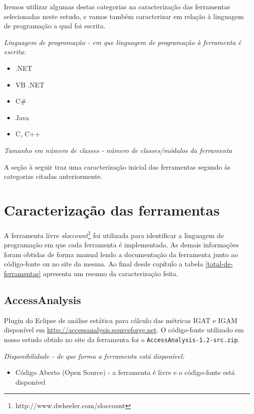 Iremos utilizar algumas destas categorias na caracterização das ferramentas
selecionadas neste estudo, e vamos também caracterizar em relação à linguagem de
programação a qual foi escrita.

\begin{description}

  \item {\it Linguagem de programação - em que linguagem de programação à ferramenta é escrita:}
    \begin{itemize}
      \item .NET
      \item VB .NET
      \item C\#
      \item Java
      \item C, C++
    \end{itemize}

  \item {\it Tamanho em número de classes - número de classes/módulos da ferramenta}

\end{description}

A seção à seguir traz uma caracterização inicial das ferramentas segundo às
categorias citadas anteriormente.

\section{Caracterização das ferramentas} \label{caracterizacao-das-ferramentas}

A ferramenta livre {\it sloccount}\footnote{http://www.dwheeler.com/sloccount}
foi utilizada para identificar a linguagem de programação em que cada
ferramenta é implementada. As demais informações foram obtidas de forma manual
lendo a documentação da ferramenta junto ao código-fonte ou no site da mesma.
Ao final desde capítulo a tabela \ref{total-de-ferramentas} apresenta um resumo
da caracterização feita.

\subsection{AccessAnalysis}

Plugin do Eclipse de análise estática 
para cálculo das métricas IGAT e IGAM
disponível em \url{http://accessanalysis.sourceforge.net}. O código-fonte
utilizado em nosso estudo obtido no site da ferramenta foi o
\texttt{AccessAnalysis-1.2-src.zip}.

\begin{description}

  \item {\it Disponibilidade - de que forma a ferramenta está disponível:}
    \begin{itemize}
      \item Código Aberto (Open Source) - a ferramenta é livre e o código-fonte está disponível
    \end{itemize}

\end{description}

